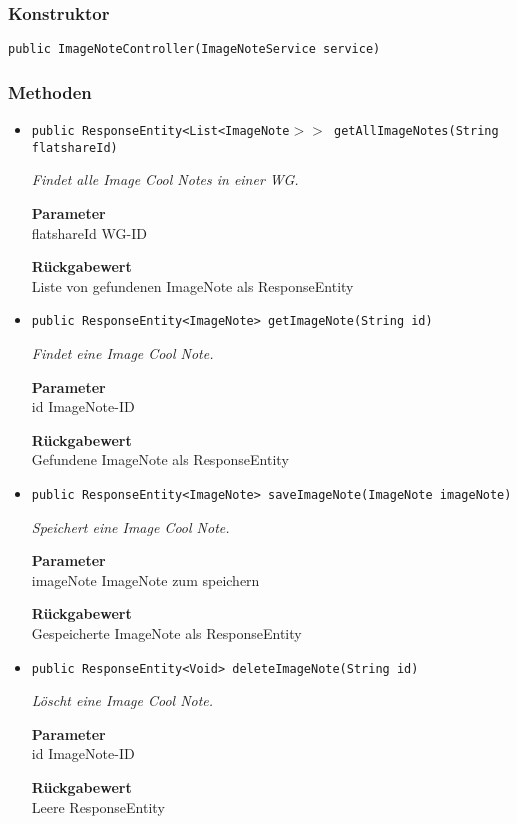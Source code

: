     \subsubsection{Konstruktor}
    \texttt{public ImageNoteController(ImageNoteService service)}
    \subsubsection{Methoden}
    \begin{itemize}
    	\item{\texttt{public ResponseEntity<List<ImageNote$>>$ getAllImageNotes(String flatshareId)}}
    	
    	\textit{Findet alle Image Cool Notes in einer WG.}
    	
    	\textbf{Parameter} \\
    	flatshareId WG-ID
    	
    	\textbf{Rückgabewert} \\
    	Liste von gefundenen ImageNote als ResponseEntity        \item{\texttt{public ResponseEntity<ImageNote> getImageNote(String id)}}
    	
    	\textit{Findet eine Image Cool Note.}
    	
    	\textbf{Parameter} \\
    	id ImageNote-ID
    	
    	\textbf{Rückgabewert} \\
    	Gefundene ImageNote als ResponseEntity        \item{\texttt{public ResponseEntity<ImageNote> saveImageNote(ImageNote imageNote)}}
    	
    	\textit{Speichert eine Image Cool Note.}
    	
    	\textbf{Parameter} \\
    	imageNote ImageNote zum speichern
    	
    	\textbf{Rückgabewert} \\
    	Gespeicherte ImageNote als ResponseEntity        \item{\texttt{public ResponseEntity<Void> deleteImageNote(String id)}}
    	
    	\textit{Löscht eine Image Cool Note.}
    	
    	\textbf{Parameter} \\
    	id ImageNote-ID
    	
    	\textbf{Rückgabewert} \\
    	Leere ResponseEntity
    \end{itemize}
